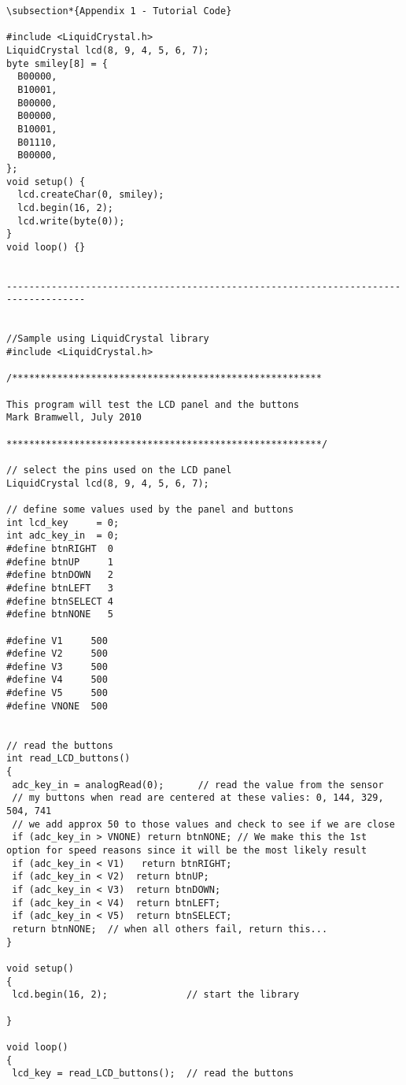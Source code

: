 \documentclass[10pt]{report}
\begin{document}
\begin{verbatim}
\subsection*{Appendix 1 - Tutorial Code}

#include <LiquidCrystal.h>
LiquidCrystal lcd(8, 9, 4, 5, 6, 7);
byte smiley[8] = {
  B00000,
  B10001,
  B00000,
  B00000,
  B10001,
  B01110,
  B00000,
};
void setup() {
  lcd.createChar(0, smiley);
  lcd.begin(16, 2);  
  lcd.write(byte(0));
}
void loop() {}


------------------------------------------------------------------------------------


//Sample using LiquidCrystal library
#include <LiquidCrystal.h>
 
/*******************************************************
 
This program will test the LCD panel and the buttons
Mark Bramwell, July 2010
 
********************************************************/
 
// select the pins used on the LCD panel
LiquidCrystal lcd(8, 9, 4, 5, 6, 7);
 
// define some values used by the panel and buttons
int lcd_key     = 0;
int adc_key_in  = 0;
#define btnRIGHT  0
#define btnUP     1
#define btnDOWN   2
#define btnLEFT   3
#define btnSELECT 4
#define btnNONE   5

#define V1     500
#define V2     500
#define V3     500
#define V4     500
#define V5     500
#define VNONE  500

 
// read the buttons
int read_LCD_buttons()
{
 adc_key_in = analogRead(0);      // read the value from the sensor 
 // my buttons when read are centered at these valies: 0, 144, 329, 504, 741
 // we add approx 50 to those values and check to see if we are close
 if (adc_key_in > VNONE) return btnNONE; // We make this the 1st option for speed reasons since it will be the most likely result
 if (adc_key_in < V1)   return btnRIGHT;  
 if (adc_key_in < V2)  return btnUP; 
 if (adc_key_in < V3)  return btnDOWN; 
 if (adc_key_in < V4)  return btnLEFT; 
 if (adc_key_in < V5)  return btnSELECT;   
 return btnNONE;  // when all others fail, return this...
}
 
void setup()
{
 lcd.begin(16, 2);              // start the library

}
  
void loop()
{ 
 lcd_key = read_LCD_buttons();  // read the buttons
 

\end{verbatim}
\end{document}
